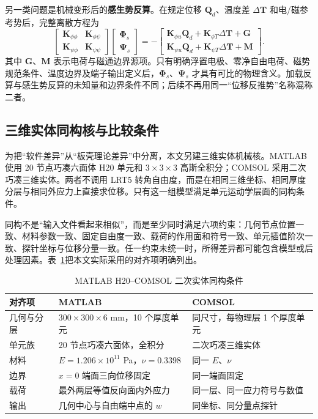 \documentclass[UTF8,fontset=windows,11pt,a4paper]{ctexart}
\begin{document}
另一类问题是机械变形后的\textbf{感生势反算}。在规定位移 $\mathbf Q_d$、温度差 $\Delta\mathbf T$ 和电/磁参考势后，完整离散方程为
\[
\begin{bmatrix}
\mathbf K_{\phi\phi} & \mathbf K_{\phi\psi}\\
\mathbf K_{\psi\phi} & \mathbf K_{\psi\psi}
\end{bmatrix}
\begin{bmatrix}\boldsymbol\Phi_s\\\boldsymbol\Psi_s\end{bmatrix}
=-
\begin{bmatrix}
\mathbf K_{\phi u}\mathbf Q_d+\mathbf K_{\phi T}\Delta\mathbf T+\mathbf G\\
\mathbf K_{\psi u}\mathbf Q_d+\mathbf K_{\psi T}\Delta\mathbf T+\mathbf M
\end{bmatrix}.
\]
其中 $\mathbf G$、$\mathbf M$ 表示电荷与磁通边界源项。只有明确浮置电极、零净自由电荷、磁势规范条件、温度边界及端子输出定义后，$\boldsymbol\Phi_s$、$\boldsymbol\Psi_s$ 才具有可比的物理含义。加载反算与感生势反算的未知量和边界条件不同；后续不再用同一“位移反推势”名称混称二者。

\subsection{三维实体同构核与比较条件}

为把“软件差异”从“板壳理论差异”中分离，本文另建三维实体机械核。MATLAB 使用 20 节点巧凑六面体 H20 单元和 $3\times3\times3$ 高斯全积分；COMSOL 采用二次巧凑三维实体。两者不调用 LRT5 转角自由度，而是在相同三维坐标、相同厚度分层与相同外应力上直接求位移。只有这一组模型满足单元运动学层面的同构条件。

同构不是“输入文件看起来相似”，而是至少同时满足六项约束：几何节点位置一致、材料参数一致、固定自由度一致、载荷的作用面和符号一致、单元插值阶次一致、探针坐标与位移分量一致。任一约束未统一时，所得差异都可能包含模型或后处理因素。表~\ref{tab:isomorphic_conditions}把本文实际采用的对齐项明确列出。

\begin{table}[H]
\centering
\caption{MATLAB H20--COMSOL 二次实体同构条件}
\label{tab:isomorphic_conditions}
\small
\begin{tabularx}{\textwidth}{p{}XX}
\toprule
对齐项 & MATLAB & COMSOL \\
\midrule
几何与分层 & $300\times300\times6$ mm，10 个厚度单元 & 同尺寸，每物理层 1 个厚度单元 \\
单元族 & 20 节点巧凑六面体，全积分 & 二次巧凑三维实体 \\
材料 & $E=1.206\times10^{11}$ Pa，$\nu=0.3398$ & 同一 $E$、$\nu$ \\
边界 & $x=0$ 端面三向位移固定 & 同一端面固定 \\
载荷 & 最外两层等值反向面内外应力 & 同一层、同一应力符号与数值 \\
输出 & 几何中心与自由端中点的 $w$ & 同坐标、同分量点探针 \\
\bottomrule
\end{tabularx}
\end{table}
\end{document}
